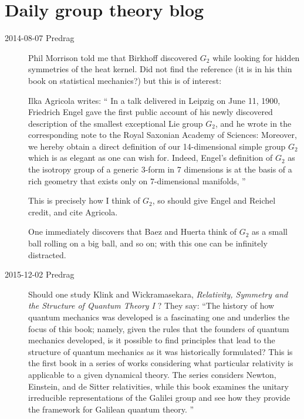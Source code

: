 \section{Daily group theory blog}
\label{s-groupTheBlog}



\begin{description}
\item[2014-08-07  Predrag]
Phil Morrison told me that Birkhoff discovered $G_2$ while looking for
hidden symmetries of the heat kernel. Did not find the reference (it is
in his thin book on statistical mechanics?) but this is of interest:

Ilka Agricola writes:
``
In a talk delivered in Leipzig on June 11, 1900, Friedrich
Engel gave the first public account of his newly discovered
description of the smallest exceptional Lie group $G_2$, and he wrote in
the corresponding note to the Royal Saxonian Academy of Sciences:
Moreover, we hereby obtain a direct definition of our 14-dimensional
simple group $G_2$ which is as elegant as one can wish for. Indeed,
Engel's definition of $G_2$ as the isotropy group of a generic 3-form in
7 dimensions is at the basis of a rich geometry that exists only on
7-dimensional manifolds,
''

This is precisely how I think of $G_2$, so should give Engel and
Reichel credit, and
cite Agricola.

One immediately discovers that Baez and Huerta think of
$G_2$ as a small ball rolling on a big ball, and so on; with this one can
be infinitely distracted.

\item[2015-12-02  Predrag]
Should one study
Klink and Wickramasekara,
{\em Relativity, Symmetry and the Structure of Quantum Theory I} ?
They say: ``The history of how quantum mechanics was developed is a
fascinating one and underlies the focus of this book; namely, given the
rules that the founders of quantum mechanics developed, is it possible to
find principles that lead to the structure of quantum mechanics as it was
historically formulated? This is the first book in a series of works
considering what particular relativity is applicable to a given dynamical
theory. The series considers Newton, Einstein, and de Sitter
relativities, while this book examines the unitary irreducible
representations of the Galilei group and see how they provide the
framework for Galilean quantum theory.
''



\end{description}
\renewcommand{\ssp}{a}
